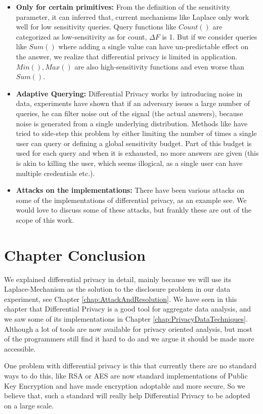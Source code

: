 \documentclass[12pt]{report}
\theoremstyle{named}
\begin{document}
\begin{itemize}
  \item \textbf{Only for certain primitives:} From the definition of the sensitivity parameter, it can inferred that, current mechanisms like Laplace only work well for low sensitivity queries. Query functions like $Count()$ are categorized as low-sensitivity as for count, $\Delta F$ is 1. But if we consider queries like $Sum()$ where adding a single value can have un-predictable effect on the answer, we realize that differential privacy is limited in application. $Min(),Max()$ are also high-sensitivity functions and even worse than $Sum()$.
  \item \textbf{Adaptive Querying:} Differential Privacy works by introducing noise in data, experiments have shown that if an adversary issues a large number of queries, he can filter noise out of the signal (the actual answers), because noise is generated from a single underlying distribution. Methods like \cite{dwork2004privacy} have tried to side-step this problem by either limiting the number of times a single user can query or defining a global sensitivity budget. Part of this budget is used for each query and when it is exhausted, no more answers are given (this is akin to killing the user, which seems illogical, as a single user can have multiple credentials etc.).
  \item \textbf{Attacks on the implementations:} There have been various attacks on some of the implementations of differential privacy, as an example see\cite{haeberlen2011differential}. We would love to discuss some of these attacks, but frankly these are out of the scope of this work.
\end{itemize}
\section{Chapter Conclusion}
We explained differential privacy in detail, mainly because we will use its Laplace-Mechanism as the solution to the disclosure problem in our data experiment, see Chapter \ref{chap:AttackAndResolution}. We have seen in this chapter that Differential Privacy is a good tool for aggregate data analysis, and we saw some of its implementations in Chapter \ref{chap:PrivacyDataTechniques}. Although a lot of tools are now available for privacy oriented analysis, but most of the programmers still find it hard to do and we argue it should be made more accessible. 

One problem with differential privacy is this that currently there are no standard ways to do this, like RSA or AES are now standard implementations of Public Key Encryption and have made encryption adoptable and more secure. So we believe that, such a standard will really help Differential Privacy to be adopted on a large scale.
\end{document}
